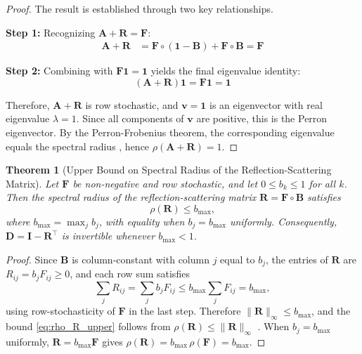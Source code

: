 \documentclass[preprint,1p,times]{elsarticle}
\theoremstyle{plain}
\newtheorem{theorem}{Theorem}[section]
\theoremstyle{definition}
\theoremstyle{remark}
\begin{document}
\begin{proof}
The result is established through two key relationships.

\textbf{Step 1:} Recognizing $\mathbf{A}+\mathbf{R}=\mathbf{F}$:
\begin{align}
	\mathbf{A} + \mathbf{R} &= \mathbf{F} \circ (\mathbf{1}-\mathbf{B})+\mathbf{F} \circ \mathbf{B} = \mathbf{F}
\label{eq:A_plus_R_is_F}
\end{align}

\textbf{Step 2:} Combining with $\mathbf{F}\mathbf{1}=\mathbf{1}$ yields the final eigenvalue identity:
\begin{equation}
(\mathbf{A} + \mathbf{R})\mathbf{1} = \mathbf{F}\mathbf{1} = \mathbf{1}
\end{equation}

Therefore, $\mathbf{A}+\mathbf{R}$ is row stochastic, and $\mathbf{v} = \mathbf{1}$ is an eigenvector with real eigenvalue $\lambda = 1$. Since all components of $\mathbf{v}$ are positive, this is the Perron eigenvector. By the Perron-Frobenius theorem, the corresponding eigenvalue equals the spectral radius \citep{HornJohnson2018}, hence $\rho(\mathbf{A} + \mathbf{R}) = 1$.
\end{proof}

\begin{theorem}[Upper Bound on Spectral Radius of the Reflection-Scattering Matrix]
\label{thm:reflection_upper_bound}
Let $\mathbf{F}$ be non-negative and row stochastic, and let $0 \leq b_k \leq 1$ for all $k$. Then the spectral radius of the reflection-scattering matrix $\mathbf{R} = \mathbf{F} \circ \mathbf{B}$ satisfies
\begin{equation}
\rho(\mathbf{R}) \leq b_{\max},
\label{eq:rho_R_upper}
\end{equation}
where $b_{\max} = \max_j b_j$, with equality when $b_j = b_{\max}$ uniformly. Consequently, $\mathbf{D} = \mathbf{I} - \mathbf{R}^\top$ is invertible whenever $b_{\max} < 1$.
\end{theorem}

\begin{proof}
Since $\mathbf{B}$ is column-constant with column $j$ equal to $b_j$, the entries of $\mathbf{R}$ are $R_{ij} = b_j F_{ij} \geq 0$, and each row sum satisfies
\begin{equation*}
\sum_j R_{ij} = \sum_j b_j F_{ij} \leq b_{\max} \sum_j F_{ij} = b_{\max},
\end{equation*}
using row-stochasticity of $\mathbf{F}$ in the last step. Therefore $\|\mathbf{R}\|_\infty \leq b_{\max}$, and the bound \eqref{eq:rho_R_upper} follows from $\rho(\mathbf{R}) \leq \|\mathbf{R}\|_\infty$ \citep{HornJohnson2018}. When $b_j = b_{\max}$ uniformly, $\mathbf{R} = b_{\max} \mathbf{F}$ gives $\rho(\mathbf{R}) = b_{\max}\, \rho(\mathbf{F}) = b_{\max}$.
\end{proof}
\end{document}
